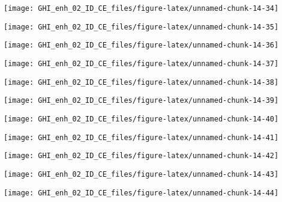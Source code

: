 \documentclass[
  10pt,
  a4paper,oneside]{article}
\begin{document}
\begin{center}\texttt{[image: GHI\_enh\_02\_ID\_CE\_files/figure-latex/unnamed-chunk-14-34]} \end{center}

\begin{center}\texttt{[image: GHI\_enh\_02\_ID\_CE\_files/figure-latex/unnamed-chunk-14-35]} \end{center}

\begin{center}\texttt{[image: GHI\_enh\_02\_ID\_CE\_files/figure-latex/unnamed-chunk-14-36]} \end{center}

\begin{center}\texttt{[image: GHI\_enh\_02\_ID\_CE\_files/figure-latex/unnamed-chunk-14-37]} \end{center}

\begin{center}\texttt{[image: GHI\_enh\_02\_ID\_CE\_files/figure-latex/unnamed-chunk-14-38]} \end{center}

\begin{center}\texttt{[image: GHI\_enh\_02\_ID\_CE\_files/figure-latex/unnamed-chunk-14-39]} \end{center}

\begin{center}\texttt{[image: GHI\_enh\_02\_ID\_CE\_files/figure-latex/unnamed-chunk-14-40]} \end{center}

\begin{center}\texttt{[image: GHI\_enh\_02\_ID\_CE\_files/figure-latex/unnamed-chunk-14-41]} \end{center}

\begin{center}\texttt{[image: GHI\_enh\_02\_ID\_CE\_files/figure-latex/unnamed-chunk-14-42]} \end{center}

\begin{center}\texttt{[image: GHI\_enh\_02\_ID\_CE\_files/figure-latex/unnamed-chunk-14-43]} \end{center}

\begin{center}\texttt{[image: GHI\_enh\_02\_ID\_CE\_files/figure-latex/unnamed-chunk-14-44]} \end{center}
\end{document}
